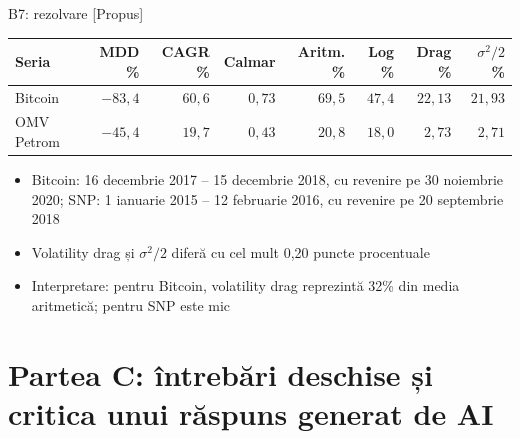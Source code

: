 \ifsolutions
\begin{frame}{B7: rezolvare [Propus]}
\itemsize{\footnotesize}
\begin{center}
\footnotesize
\begin{tabular}{lrrrrrrr}
\toprule
Seria & MDD \% & CAGR \% & Calmar & Aritm. \% & Log \% & Drag \% & $\sigma^2/2$ \% \\
\midrule
Bitcoin & $-83{,}4$ & $60{,}6$ & $0{,}73$ & $69{,}5$ & $47{,}4$ & $22{,}13$ & $21{,}93$ \\
OMV Petrom & $-45{,}4$ & $19{,}7$ & $0{,}43$ & $20{,}8$ & $18{,}0$ & $2{,}73$ & $2{,}71$ \\
\bottomrule
\end{tabular}
\end{center}
\begin{itemize}
    \item Bitcoin: 16 decembrie 2017 -- 15 decembrie 2018, cu revenire pe 30 noiembrie 2020; SNP: 1 ianuarie 2015 -- 12 februarie 2016, cu revenire pe 20 septembrie 2018
    \item Volatility drag și $\sigma^2/2$ diferă cu cel mult 0{,}20 puncte procentuale
    \item Interpretare: pentru Bitcoin, volatility drag reprezintă 32\% din media aritmetică; pentru SNP este mic
\end{itemize}
\end{frame}
\fi


\section{Partea C: întrebări deschise și critica unui răspuns generat de AI}

